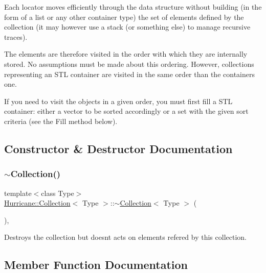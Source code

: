 Each locator moves efficiently through the data structure without building (in the form of a list or any other container type) the set of elements defined by the collection (it may however use a stack (or something else) to manage recursive traces).

The elements are therefore visited in the order with which they are internally stored. No assumptions must be made about this ordering. However, collections representing an S\+TL container are visited in the same order than the container\textquotesingle{}s one.

If you need to visit the objects in a given order, you must first fill a S\+TL container\+: either a vector to be sorted accordingly or a set with the given sort criteria (see the Fill method below). 

\subsection{Constructor \& Destructor Documentation}
\mbox{\label{classHurricane_1_1Collection_aafcf8e05658e245b2a762baa7a59f281}} 
\subsubsection{\texorpdfstring{$\sim$\+Collection()}{~Collection()}}
{\footnotesize\ttfamily template$<$class Type$>$ \\
\hyperlink{classHurricane_1_1Collection}{Hurricane\+::\+Collection}$<$ Type $>$\+::$\sim$\hyperlink{classHurricane_1_1Collection}{Collection}$<$ Type $>$ (\begin{DoxyParamCaption}{ }\end{DoxyParamCaption})\hspace{0.3cm}{\ttfamily [inline]}, {\ttfamily [virtual]}}

Destroys the collection but doesn\textquotesingle{}t acts on elements refered by this collection. 

\subsection{Member Function Documentation}
\mbox{\label{classHurricane_1_1Collection_ac75b91d3952b36e14f21174958523924}} 
